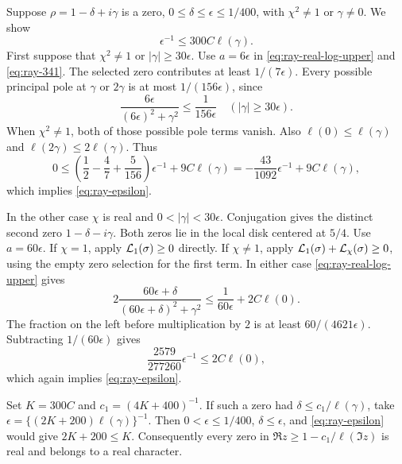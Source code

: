Suppose \(\rho=1-\delta+i\gamma\) is a zero,
\(0\leq\delta\leq\epsilon\leq1/400\), with
\(\chi^2\ne1\) or \(\gamma\ne0\).
We show
\begin{equation}
 \label{eq:ray-epsilon}
                           \epsilon^{-1}\leq300C\ell(\gamma).
\end{equation}
First suppose that \(\chi^2\ne1\) or \(|\gamma|\geq30\epsilon\).
Use \(a=6\epsilon\) in
\eqref{eq:ray-real-log-upper} and \eqref{eq:ray-341}.
The selected zero contributes at least \(1/(7\epsilon)\).
Every possible principal pole at \(\gamma\) or \(2\gamma\) is at
most \(1/(156\epsilon)\), since
\[
          \frac{6\epsilon}{(6\epsilon)^2+\gamma^2}
                         \leq\frac1{156\epsilon}
                         \quad(|\gamma|\geq30\epsilon).
\]
When \(\chi^2\ne1\), both of those possible pole terms vanish.
Also \(\ell(0)\leq\ell(\gamma)\) and
\(\ell(2\gamma)\leq2\ell(\gamma)\).
Thus
\[
 0\leq
 \left(\frac12-\frac47+\frac5{156}\right)\epsilon^{-1}
                                      +9C\ell(\gamma)
       =-\frac{43}{1092}\epsilon^{-1}+9C\ell(\gamma),
\]
which implies \eqref{eq:ray-epsilon}.

In the other case \(\chi\) is real and
\(0<|\gamma|<30\epsilon\).
Conjugation gives the distinct second zero \(1-\delta-i\gamma\).
Both zeros lie in the local disk centered at \(5/4\).
Use \(a=60\epsilon\).
If \(\chi=1\), apply \({\cal L}_1(\sigma)\geq0\) directly.
If \(\chi\ne1\), apply
\({\cal L}_1(\sigma)+{\cal L}_\chi(\sigma)\geq0\), using the
empty zero selection for the first term.
In either case \eqref{eq:ray-real-log-upper} gives
\[
 2\frac{60\epsilon+\delta}{(60\epsilon+\delta)^2+\gamma^2}
                     \leq\frac1{60\epsilon}+2C\ell(0).
\]
The fraction on the left before multiplication by \(2\) is at
least \(60/(4621\epsilon)\). Subtracting \(1/(60\epsilon)\)
gives
\[
           \frac{2579}{277260}\epsilon^{-1}
                                      \leq2C\ell(0),
\]
which again implies \eqref{eq:ray-epsilon}.

Set \(K=300C\) and \(c_1=(4K+400)^{-1}\).
If such a zero had
\(\delta\leq c_1/\ell(\gamma)\), take
\(\epsilon=\{(2K+200)\ell(\gamma)\}^{-1}\).
Then \(0<\epsilon\leq1/400\), \(\delta\leq\epsilon\), and
\eqref{eq:ray-epsilon} would give \(2K+200\leq K\).
Consequently every zero in
\(\Re z\geq1-c_1/\ell(\Im z)\) is real and belongs to a real
character.

